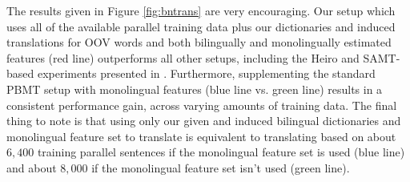 \documentclass[11pt]{article}
\begin{document}

The results given in Figure \ref{fig:bntrans} are very encouraging. Our setup which uses all of the available parallel training data plus our dictionaries and induced translations for OOV words and both bilingually and monolingually estimated features (red line) outperforms all other setups, including the Heiro and SAMT-based experiments presented in . Furthermore, supplementing the standard PBMT setup with monolingual features (blue line vs. green line) results in a consistent performance gain, across varying amounts of training data. The final thing to note is that using only our given and induced bilingual dictionaries and monolingual feature set to translate is equivalent to translating based on about $6,400$ training parallel sentences if the monolingual feature set is used (blue line) and about $8,000$ if the monolingual feature set isn't used (green line).
\end{document}
